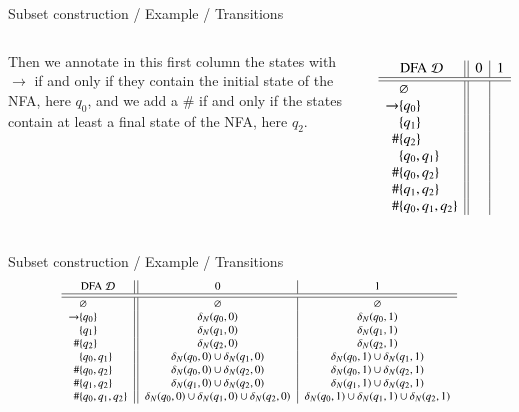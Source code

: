 %
\begin{frame}{Subset construction / Example / Transitions}

\begin{columns}

   Then we annotate in this first column the
  states with \(\rightarrow\) if and only if they contain the initial
  state of the NFA, here \(q_0\), and we add a \(\#\) if and only if
  the states contain at least a final state of the NFA, here \(q_2\).

  \[
  \begin{array}{r@{}l||c|c}
    \multicolumn{2}{c||}{\text{DFA} \; {\cal D}} & 0 & 1\\
    \hline\hline
                & \varnothing       & &\\
    \rightarrow & \{q_0\}           & &\\
                & \{q_1\}           & &\\
             \# & \{q_2\}           & &\\
                & \{q_0, q_1\}      & &\\
             \# & \{q_0, q_2\}      & &\\
             \# & \{q_1, q_2\}      & &\\
             \# & \{q_0, q_1, q_2\} & &
  \end{array}
  \]
\end{columns}

\end{frame}

%
\begin{frame}{Subset construction / Example / Transitions}
\[\footnotesize
\begin{array}{r@{}l||c|c}
\multicolumn{2}{c||}{\text{DFA} \; {\cal D}} & 0 & 1\\
\hline\hline
            & \varnothing & \varnothing & \varnothing\\
\rightarrow & \{q_0\} & \delta_N(q_0, 0) & \delta_N(q_0, 1)\\
            & \{q_1\} & \delta_N(q_1, 0) & \delta_N(q_1, 1)\\
         \# & \{q_2\} & \delta_N(q_2, 0) & \delta_N(q_2, 1)\\
            & \{q_0, q_1\} & \delta_N(q_0,0) \cup \delta_N(q_1,0)
                           & \delta_N(q_0,1) \cup \delta_N(q_1,1)\\
         \# & \{q_0, q_2\} & \delta_N(q_0,0) \cup \delta_N(q_2,0)
                           & \delta_N(q_0,1) \cup \delta_N(q_2,1)\\
         \# & \{q_1, q_2\} & \delta_N(q_1,0) \cup \delta_N(q_2,0)
                           & \delta_N(q_1,1) \cup \delta_N(q_2,1)\\
         \# & \{q_0, q_1, q_2\}
            & \delta_N(q_0,0) \cup \delta_N(q_1,0) \cup \delta_N(q_2,0)
            & \delta_N(q_0,1) \cup \delta_N(q_1,1) \cup \delta_N(q_2,1)
\end{array}
\]

\end{frame}

